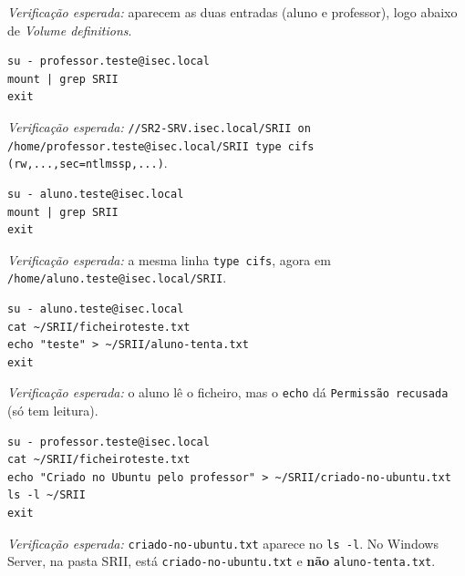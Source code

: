 \emph{Verificação esperada:} aparecem as duas entradas (aluno e professor), logo abaixo de \emph{Volume definitions}.


\begin{lstlisting}[style=bashstyle]
su - professor.teste@isec.local
mount | grep SRII
exit
\end{lstlisting}

\emph{Verificação esperada:} \texttt{/\allowbreak{}/\allowbreak{}SR2-SRV.isec.local/\allowbreak{}SRII on /\allowbreak{}home/\allowbreak{}professor.teste@isec.local/\allowbreak{}SRII type cifs (rw,\allowbreak{}...,\allowbreak{}sec=ntlmssp,\allowbreak{}...)}.


\begin{lstlisting}[style=bashstyle]
su - aluno.teste@isec.local
mount | grep SRII
exit
\end{lstlisting}

\emph{Verificação esperada:} a mesma linha \texttt{type cifs}, agora em \texttt{/\allowbreak{}home/\allowbreak{}aluno.teste@isec.local/\allowbreak{}SRII}.


\begin{lstlisting}[style=bashstyle]
su - aluno.teste@isec.local
cat ~/SRII/ficheiroteste.txt
echo "teste" > ~/SRII/aluno-tenta.txt
exit
\end{lstlisting}

\emph{Verificação esperada:} o aluno lê o ficheiro, mas o \texttt{echo} dá \texttt{Permissão recusada} (só tem leitura).


\begin{lstlisting}[style=bashstyle]
su - professor.teste@isec.local
cat ~/SRII/ficheiroteste.txt
echo "Criado no Ubuntu pelo professor" > ~/SRII/criado-no-ubuntu.txt
ls -l ~/SRII
exit
\end{lstlisting}

\emph{Verificação esperada:} \texttt{criado-no-ubuntu.txt} aparece no \texttt{ls -l}. No Windows Server, na pasta SRII, está \texttt{criado-no-ubuntu.txt} e \textbf{não} \texttt{aluno-tenta.txt}.

